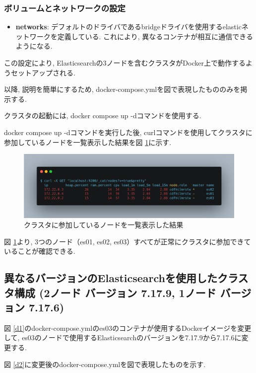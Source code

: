 \subsubsection*{ボリュームとネットワークの設定}
\begin{itemize}
  \item \textbf{networks}: デフォルトのドライバであるbridgeドライバを使用するelasticネットワークを定義している. これにより, 異なるコンテナが相互に通信できるようになる.
\end{itemize}

この設定により, Elasticsearchの3ノードを含むクラスタがDocker上で動作するようセットアップされる.

以降, 説明を簡単にするため, docker-compose.ymlを図で表現したもののみを掲示する.

クラスタの起動には, docker compose up -dコマンドを使用する.

docker compose up -dコマンドを実行した後, curlコマンドを使用してクラスタに参加しているノードを一覧表示した結果を図 \ref{p1}に示す.

\begin{figure}[!ht]
  \begin{center}
    \includegraphics[width=160mm]{sotu/figure/curl-same.png}
    \caption{クラスタに参加しているノードを一覧表示した結果}
    \label{p1}
  \end{center}
\end{figure}

図 \ref{p1}より, 3つのノード（es01, es02, es03）すべてが正常にクラスタに参加できていることが確認できる.

\subsection{異なるバージョンのElasticsearchを使用したクラスタ構成 (2ノード バージョン 7.17.9, 1ノード バージョン 7.17.6)}

図 \ref{d1}のdocker-compose.ymlのes03のコンテナが使用するDockerイメージを変更して, es03のノードで使用するElasticsearchのバージョンを7.17.9から7.17.6に変更する.

図 \ref{d2}に変更後のdocker-compose.ymlを図で表現したものを示す.

